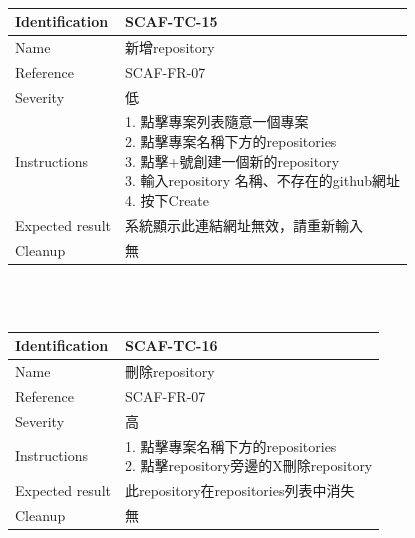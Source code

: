 \documentclass{report}
\begin{document}
\newline
\\
\begin{tabularx}{\textwidth}{
  |p{}%
  |p{}|%
  }
  \hline
  \centering Identification &  SCAF-TC-15 \\
  \hline
  \centering Name & 新增repository \\
  \hline
  \centering Reference & SCAF-FR-07 \\
  \hline
  \centering Severity & 低 \\
  \hline
  \centering Instructions & 
  \makecell[l]{
    1. 點擊專案列表隨意一個專案 \\
    2. 點擊專案名稱下方的repositories \\
    3. 點擊+號創建一個新的repository \\
    3. 輸入repository 名稱、不存在的github網址  \\
    4. 按下Create
  }\\
  \hline
  \centering Expected result & 系統顯示此連結網址無效，請重新輸入 \\
  \hline
  \centering Cleanup & 無 \\
  \hline
\end{tabularx}
\\
\newline
\\
\begin{tabularx}{\textwidth}{
  |p{}%
  |p{}|%
  }
  \hline
  \centering Identification &  SCAF-TC-16 \\
  \hline
  \centering Name & 刪除repository \\
  \hline
  \centering Reference & SCAF-FR-07 \\
  \hline
  \centering Severity & 高 \\
  \hline
  \centering Instructions & 
  \makecell[l]{
    1. 點擊專案名稱下方的repositories \\
    2. 點擊repository旁邊的X刪除repository \\
  }\\
  \hline
  \centering Expected result & 此repository在repositories列表中消失 \\
  \hline
  \centering Cleanup & 無 \\
  \hline
\end{tabularx}
\\
\end{document}
